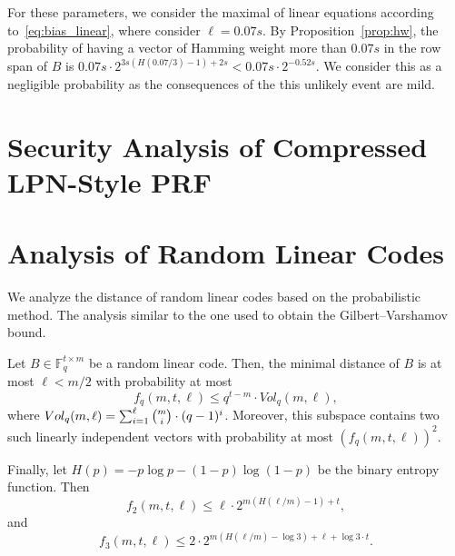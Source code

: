 \documentclass[orivec,envcountsect]{llncs}
\begin{document}
For these parameters, we consider the maximal of linear equations according to~\ref{eq:bias_linear},
where consider $\ell = 0.07 s$.
By Proposition~\ref{prop:hw},
the probability of having a vector of Hamming weight more than $0.07 s$
in the row span of $B$ is
$0.07 s \cdot 2^{3s (H(0.07/3) - 1) + 2s} < 0.07 s \cdot 2^{-0.52 s}$.
We consider this as a negligible probability
as the consequences of the this unlikely event are mild.


\section{Security Analysis of Compressed LPN-Style PRF}






\appendix

\section{Analysis of Random Linear Codes}
\label{app:distance}

We analyze the distance of random linear codes based on the probabilistic method.
The analysis similar to the one used to obtain the Gilbert–Varshamov bound.

\begin{proposition}
\label{prop:hw}
Let $B \in \mathbb{F}^{t \times m}_{q}$ be a random linear code.
Then, the minimal distance of $B$ is at most $\ell < m/2$ with probability at most
$$f_q(m,t,\ell) \leq q^{t-m} \cdot Vol_q(m,\ell),$$
where $Vol_q(m,\ell) = \sum_{i=1}^\ell \tbinom{m}{i} \cdot (q-1)^{i}$.
Moreover, this subspace contains two such linearly independent vectors with probability at most $(f_q(m,t,\ell))^2$.

Finally, let $H(p) = - p \log p - (1-p) \log(1-p)$ be the binary entropy function.
Then
$$f_2(m,t,\ell) \leq \ell \cdot 2^{m (H(\ell/m) - 1) + t},$$
and
$$f_3(m,t,\ell) \leq 2 \cdot 2^{m (H(\ell/m) - \log 3) + \ell + \log 3 \cdot t}.$$
\end{proposition}
\end{document}
